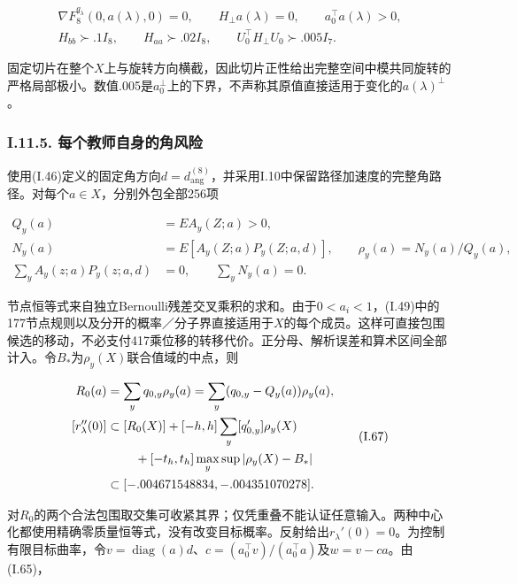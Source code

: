 \documentclass[11pt,a4paper]{article}
\begin{document}
\[
\begin{gathered}
\nabla F_8^{q_\lambda}(0,a(\lambda),0)=0,\qquad
H_\perp a(\lambda)=0,\qquad a_0^\top a(\lambda)>0,\\
H_{bb}\succ .1I_8,\qquad H_{aa}\succ .02I_8,\qquad
U_0^\top H_\perp U_0\succ .005I_7.
\end{gathered}
\tag{I.65}
\]

固定切片在整个\(X\)上与旋转方向横截，因此切片正性给出完整空间中模共同旋转的严格局部极小。数值.005是\(a_0^\perp\)上的下界，不声称其原值直接适用于变化的\(a(\lambda)^\perp\)。

\subsubsection*{I.11.5.
每个教师自身的角风险}\label{i.11.5.-ux6bcfux4e2aux6559ux5e08ux81eaux8eabux7684ux89d2ux98ceux9669}

使用(I.46)定义的固定角方向\(d=d_{\mathrm{ang}}^{(8)}\)，并采用I.10中保留路径加速度的完整角路径。对每个\(a\in X\)，分别外包全部256项

\[
\begin{aligned}
Q_y(a)&=E A_y(Z;a)>0,\\
N_y(a)&=E[A_y(Z;a)P_y(Z;a,d)],\qquad
\rho_y(a)=N_y(a)/Q_y(a),\\
\sum_y A_y(z;a)P_y(z;a,d)&=0,\qquad \sum_y N_y(a)=0.
\end{aligned}
\tag{I.66}
\]

节点恒等式来自独立Bernoulli残差交叉乘积的求和。由于\(0<a_i<1\)，(I.49)中的177节点规则以及分开的概率／分子界直接适用于\(X\)的每个成员。这样可直接包围候选的移动，不必支付417乘位移的转移代价。正分母、解析误差和算术区间全部计入。令\(B_*\)为\(\rho_y(X)\)联合值域的中点，则

\[
\begin{aligned}
R_0(a)&=\sum_y q_{0,y}\rho_y(a)
=\sum_y(q_{0,y}-Q_y(a))\rho_y(a),\\
[r_\lambda''(0)]&\subset [R_0(X)]
+[-h,h]\sum_y[q'_{0,y}]\rho_y(X)\\
&\hspace{8mm}+[-t_h,t_h]\max_y\sup|\rho_y(X)-B_*|\\
&\subset[-.004671548834,-.004351070278].
\end{aligned}
\tag{I.67}
\]

对\(R_0\)的两个合法包围取交集可收紧其界；仅凭重叠不能认证任意输入。两种中心化都使用精确零质量恒等式，没有改变目标概率。反射给出\(r_\lambda'(0)=0\)。为控制有限目标曲率，令\(v=\operatorname{diag}(a)d\)、\(c=(a_0^\top v)/(a_0^\top a)\)及\(w=v-ca\)。由(I.65)，
\end{document}

